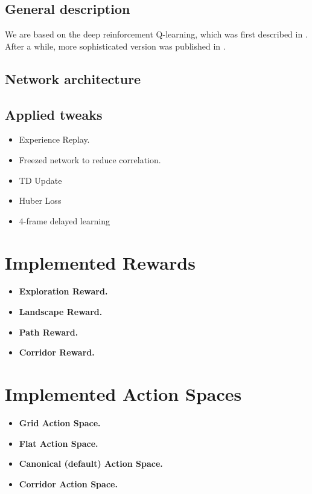 \documentclass{article}
\begin{document}
\subsection{General description} We are based on the deep reinforcement
Q-learning, which was first described in \cite{mnih2013playing}.
After a while, more sophisticated version was published in 
\cite{mnih2015humanlevel}.

\subsection{Network architecture}

\subsection{Applied tweaks}

\begin{itemize}
        \item Experience Replay.
        \item Freezed network to reduce correlation.
        \item TD Update 
        \item Huber Loss
        \item 4-frame delayed learning
\end{itemize}


\section{Implemented Rewards}

\begin{itemize}
    \item {\bf Exploration Reward.}
    \item {\bf Landscape Reward.}
    \item {\bf Path Reward.}
    \item {\bf Corridor Reward.}
\end{itemize}

\section{Implemented Action Spaces}

\begin{itemize}
    \item {\bf Grid Action Space.}
    \item {\bf Flat Action Space.}
    \item {\bf Canonical (default) Action Space.}
    \item {\bf Corridor Action Space.}
\end{itemize}
\end{document}
